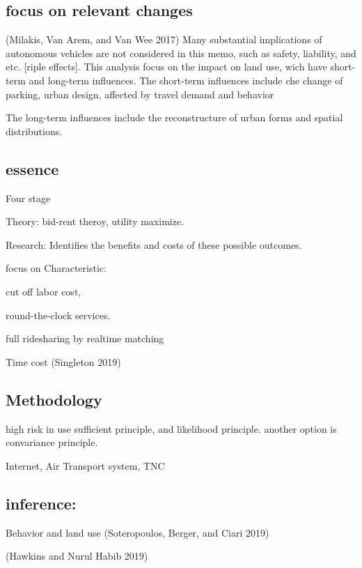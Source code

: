 \documentclass[12pt,]{article}
\begin{document}
\hypertarget{focus-on-relevant-changes}{%
\subsection{focus on relevant changes}\label{focus-on-relevant-changes}}

(Milakis, Van Arem, and Van Wee 2017) Many substantial implications of
autonomous vehicles are not considered in this memo, such as safety,
liability, and etc. {[}riple effects{]}. This analysis focus on the
impact on land use, wich have short-term and long-term influences. The
short-term influences include che change of parking, urban design,
affected by travel demand and behavior

The long-term influences include the reconstructure of urban forms and
spatial distributions.

\hypertarget{essence}{%
\subsection{essence}\label{essence}}

Four stage

Theory: bid-rent theroy, utility maximize.

Research: Identifies the benefits and costs of these possible outcomes.

focus on Characteristic:

cut off labor cost,

round-the-clock services.

full ridesharing by realtime matching

Time cost (Singleton 2019)

\hypertarget{methodology}{%
\subsection{Methodology}\label{methodology}}

high risk in use sufficient principle, and likelihood principle. another
option is convariance principle.

Internet, Air Transport system, TNC

\hypertarget{inference}{%
\subsection{inference:}\label{inference}}

Behavior and land use (Soteropoulos, Berger, and Ciari 2019)

(Hawkins and Nurul Habib 2019)
\end{document}
